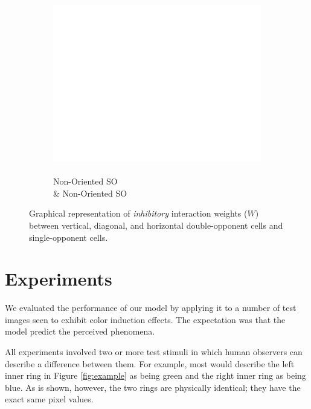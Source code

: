 \documentclass[journal,onecolumn]{IEEEtran}
\begin{document}
{\begin{figure}[htbp!]
\begin{subfigure}[b]{0.2\textwidth}
            \captionsetup{justification=centering}
            \includegraphics[width=.85\linewidth]{map-w_blank}
            \caption{\\ Non-Oriented SO \\ \& Non-Oriented SO}
    \end{subfigure}%
    \caption{Graphical representation of \textit{inhibitory} interaction weights ($W$) between vertical, diagonal, and horizontal double-opponent cells and single-opponent cells.}
\end{figure}
\clearpage
}

\newpage

%
%
%
\section{Experiments}

We evaluated the performance of our model by applying it to a number of test images seen to exhibit color induction effects. The expectation was that the model predict the perceived phenomena.

All experiments involved two or more test stimuli in which human observers can describe a difference between them. For example, most would describe the left inner ring in Figure \ref{fig:example} as being green and the right inner ring as being blue. As is shown, however, the two rings are physically identical; they have the exact same pixel values.
\end{document}
